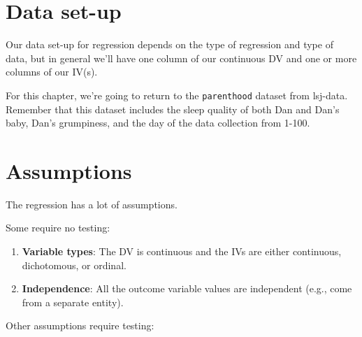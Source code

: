 \documentclass[
]{book}
\begin{document}
\hypertarget{data-set-up-8}{%
\section{Data set-up}\label{data-set-up-8}}

Our data set-up for regression depends on the type of regression and type of data, but in general we'll have one column of our continuous DV and one or more columns of our IV(s).

For this chapter, we're going to return to the \texttt{parenthood} dataset from lsj-data. Remember that this dataset includes the sleep quality of both Dan and Dan's baby, Dan's grumpiness, and the day of the data collection from 1-100.

\hypertarget{assumptions-6}{%
\section{Assumptions}\label{assumptions-6}}

The regression has a lot of assumptions.

Some require no testing:

\begin{enumerate}
\def\labelenumi{\arabic{enumi}.}
\item
  \textbf{Variable types}: The DV is continuous and the IVs are either continuous, dichotomous, or ordinal.
\item
  \textbf{Independence}: All the outcome variable values are independent (e.g., come from a separate entity).
\end{enumerate}

Other assumptions require testing:
\end{document}
